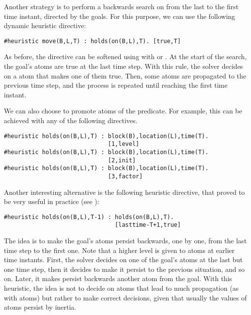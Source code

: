Another strategy is to perform a backwards search on  from the last to the
first time instant, directed by the goals. 
For this purpose, we can use the following dynamic heuristic directive: 
\begin{lstlisting}[basicstyle=\small\ttfamily,numbers=none]
#heuristic move(B,L,T) : holds(on(B,L),T). [true,T]
\end{lstlisting}
As before, the directive can be softened using  with  or .
At the start of the search, the goal's  atoms are true at the last time step.
With this rule, the solver decides on a  atom that makes one of them true.
Then, some  atoms are propagated to the previous time step,
and the process is repeated until reaching the first time instant.

We can also choose to promote atoms of the  predicate.  
For example, this can be achieved with any of the following directives.
\begin{lstlisting}[basicstyle=\small\ttfamily,numbers=none]
#heuristic holds(on(B,L),T) : block(B),location(L),time(T).
                              [1,level]
#heuristic holds(on(B,L),T) : block(B),location(L),time(T).
                              [2,init]
#heuristic holds(on(B,L),T) : block(B),location(L),time(T).
                              [3,factor]
\end{lstlisting}

Another interesting alternative is the following heuristic directive,  
that proved to be very useful in practice (see \cite{gekaotroscwa13a}):
\begin{lstlisting}[basicstyle=\small\ttfamily,numbers=none]
#heuristic holds(on(B,L),T-1) : holds(on(B,L),T). 
                                [lasttime-T+1,true] 
\end{lstlisting}
The idea is to make the goal's  atoms persist backwards, 
one by one, from the last time step to the first one.
Note that a higher level is given to atoms at earlier time instants.
First, the solver decides on one of the goal's  atoms at the last but one time step,
then it decides to make it persist to the previous situation, and so on.
Later, it makes persist backwards another  atom from the goal.
With this heuristic,
the idea is not to decide on atoms that lead to much propagation (as with  atoms)
but rather to make correct decisions, 
given that usually the values of  atoms persist by inertia.


